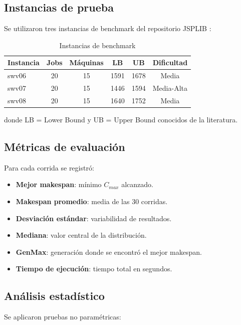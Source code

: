\documentclass[12pt,a4paper]{article}
\begin{document}
\subsection{Instancias de prueba}

Se utilizaron tres instancias de benchmark del repositorio JSPLIB \cite{jsplib}:

\begin{table}[H]
\centering
\caption{Instancias de benchmark}
\label{tab:instancias}
\begin{tabular}{@{}lccccc@{}}
\toprule
\textbf{Instancia} & \textbf{Jobs} & \textbf{Máquinas} & \textbf{LB} & \textbf{UB} & \textbf{Dificultad} \\ \midrule
swv06 & 20 & 15 & 1591 & 1678 & Media \\
swv07 & 20 & 15 & 1446 & 1594 & Media-Alta \\
swv08 & 20 & 15 & 1640 & 1752 & Media \\ \bottomrule
\end{tabular}
\end{table}

donde LB = Lower Bound y UB = Upper Bound conocidos de la literatura.

\subsection{Métricas de evaluación}

Para cada corrida se registró:

\begin{itemize}
    \item \textbf{Mejor makespan}: mínimo $C_{max}$ alcanzado.
    \item \textbf{Makespan promedio}: media de las 30 corridas.
    \item \textbf{Desviación estándar}: variabilidad de resultados.
    \item \textbf{Mediana}: valor central de la distribución.
    \item \textbf{GenMax}: generación donde se encontró el mejor makespan.
    \item \textbf{Tiempo de ejecución}: tiempo total en segundos.
\end{itemize}

\subsection{Análisis estadístico}

Se aplicaron pruebas no paramétricas:
\end{document}
